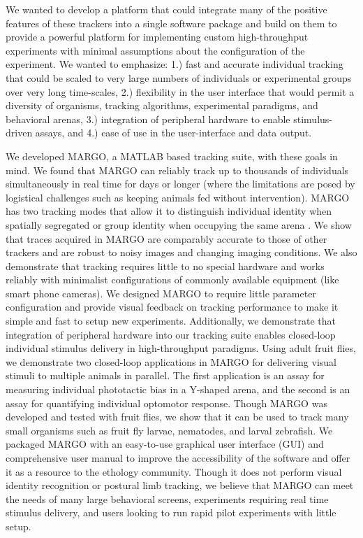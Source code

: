 \documentclass[10pt]{article}
\begin{document}
\begin{multicols}{2}
We wanted to develop a platform that could integrate many of the positive features of these trackers into a single software package and build on them to provide a powerful platform for implementing custom high-throughput experiments with minimal assumptions about the configuration of the experiment. We wanted to emphasize: 1.) fast and accurate individual tracking that could be scaled to very large numbers of individuals or experimental groups over very long time-scales, 2.) flexibility in the user interface that would permit a diversity of organisms, tracking algorithms, experimental paradigms, and behavioral arenas, 3.) integration of peripheral hardware to enable stimulus-driven assays, and  4.) ease of use in the user-interface and data output. 

We developed MARGO, a MATLAB based tracking suite, with these goals in mind. We found that MARGO can reliably track up to thousands of individuals simultaneously in real time for days or longer (where the limitations are posed by logistical challenges such as keeping animals fed without intervention). MARGO has two tracking modes that allow it to distinguish individual identity when spatially segregated or group identity when occupying the same arena . We show that traces acquired in MARGO are comparably accurate to those of other trackers and are robust to noisy images and changing imaging conditions. We also demonstrate that tracking requires little to no special hardware and works reliably with minimalist configurations of commonly available equipment (like smart phone cameras). We designed MARGO to require little parameter configuration and provide visual feedback on tracking performance to make it simple and fast to setup new experiments. Additionally, we demonstrate that integration of peripheral hardware into our tracking suite enables closed-loop individual stimulus delivery in high-throughput paradigms. Using adult fruit flies, we demonstrate two closed-loop applications in MARGO for delivering visual stimuli to multiple animals in parallel. The first application is an assay for measuring individual phototactic bias in a Y-shaped arena, and the second is an assay for quantifying individual optomotor response. Though MARGO was developed and tested with fruit flies, we show that it can be used to track many small organisms such as fruit fly larvae, nematodes, and larval zebrafish. We packaged MARGO with an easy-to-use graphical user interface (GUI) and comprehensive user manual to improve the accessibility of the software and offer it as a resource to the ethology community. Though it does not perform visual identity recognition or postural limb tracking, we believe that MARGO can meet the needs of many large behavioral screens, experiments requiring real time stimulus delivery, and users looking to run rapid pilot experiments with little setup.


\end{multicols}
\end{document}
